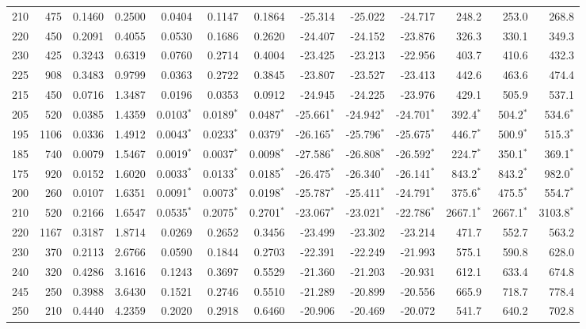 \begin{landscape}
\begin{footnotesize}
\begin{longtable}{r r r r r r r r r r r r r}
210 & 475 & 0.1460 & 0.2500 & 0.0404 & 0.1147 & 0.1864 & -25.314 & -25.022 & -24.717 & 248.2 & 253.0 & 268.8 \\
220 & 450 & 0.2091 & 0.4055 & 0.0530 & 0.1686 & 0.2620 & -24.407 & -24.152 & -23.876 & 326.3 & 330.1 & 349.3 \\
230 & 425 & 0.3243 & 0.6319 & 0.0760 & 0.2714 & 0.4004 & -23.425 & -23.213 & -22.956 & 403.7 & 410.6 & 432.3 \\
225 & 908 & 0.3483 & 0.9799 & 0.0363 & 0.2722 & 0.3845 & -23.807 & -23.527 & -23.413 & 442.6 & 463.6 & 474.4 \\
215 & 450 & 0.0716 & 1.3487 & 0.0196 & 0.0353 & 0.0912 & -24.945 & -24.225 & -23.976 & 429.1 & 505.9 & 537.1 \\
205 & 520 & 0.0385 & 1.4359 & 0.0103$^*$ & 0.0189$^*$ & 0.0487$^*$ & -25.661$^*$ & -24.942$^*$ & -24.701$^*$ & 392.4$^*$ & 504.2$^*$ & 534.6$^*$ \\
195 & 1106 & 0.0336 & 1.4912 & 0.0043$^*$ & 0.0233$^*$ & 0.0379$^*$ & -26.165$^*$ & -25.796$^*$ & -25.675$^*$ & 446.7$^*$ & 500.9$^*$ & 515.3$^*$ \\
185 & 740 & 0.0079 & 1.5467 & 0.0019$^*$ & 0.0037$^*$ & 0.0098$^*$ & -27.586$^*$ & -26.808$^*$ & -26.592$^*$ & 224.7$^*$ & 350.1$^*$ & 369.1$^*$ \\
175 & 920 & 0.0152 & 1.6020 & 0.0033$^*$ & 0.0133$^*$ & 0.0185$^*$ & -26.475$^*$ & -26.340$^*$ & -26.141$^*$ & 843.2$^*$ & 843.2$^*$ & 982.0$^*$ \\
200 & 260 & 0.0107 & 1.6351 & 0.0091$^*$ & 0.0073$^*$ & 0.0198$^*$ & -25.787$^*$ & -25.411$^*$ & -24.791$^*$ & 375.6$^*$ & 475.5$^*$ & 554.7$^*$ \\
210 & 520 & 0.2166 & 1.6547 & 0.0535$^*$ & 0.2075$^*$ & 0.2701$^*$ & -23.067$^*$ & -23.021$^*$ & -22.786$^*$ & 2667.1$^*$ & 2667.1$^*$ & 3103.8$^*$ \\
220 & 1167 & 0.3187 & 1.8714 & 0.0269 & 0.2652 & 0.3456 & -23.499 & -23.302 & -23.214 & 471.7 & 552.7 & 563.2 \\
230 & 370 & 0.2113 & 2.6766 & 0.0590 & 0.1844 & 0.2703 & -22.391 & -22.249 & -21.993 & 575.1 & 590.8 & 628.0 \\
240 & 320 & 0.4286 & 3.1616 & 0.1243 & 0.3697 & 0.5529 & -21.360 & -21.203 & -20.931 & 612.1 & 633.4 & 674.8 \\
245 & 250 & 0.3988 & 3.6430 & 0.1521 & 0.2746 & 0.5510 & -21.289 & -20.899 & -20.556 & 665.9 & 718.7 & 778.4 \\
250 & 210 & 0.4440 & 4.2359 & 0.2020 & 0.2918 & 0.6460 & -20.906 & -20.469 & -20.072 & 541.7 & 640.2 & 702.8 \\

\end{longtable}
\end{footnotesize}
\end{landscape}
